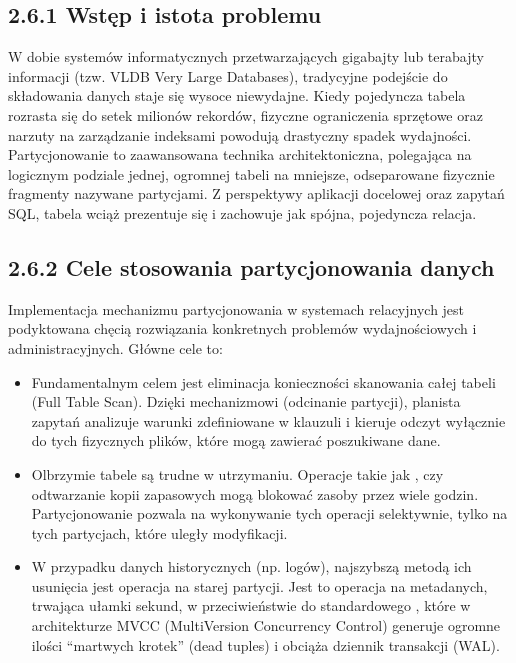\documentclass[a4paper,11pt,english,openany,oneside]{sphinxmanual}
\begin{document}
\subsection{2.6.1 Wstęp i istota problemu}
\label{\detokenize{rozdzial_2/rozdzial_26/index:wstep-i-istota-problemu}}
\sphinxAtStartPar
W dobie systemów informatycznych przetwarzających gigabajty lub terabajty informacji (tzw. VLDB \sphinxhyphen{} Very Large Databases), tradycyjne podejście do składowania danych staje się wysoce niewydajne. Kiedy pojedyncza tabela rozrasta się do setek milionów rekordów, fizyczne ograniczenia sprzętowe oraz narzuty na zarządzanie indeksami powodują drastyczny spadek wydajności. Partycjonowanie to zaawansowana technika architektoniczna, polegająca na logicznym podziale jednej, ogromnej tabeli na mniejsze, odseparowane fizycznie fragmenty nazywane partycjami. Z perspektywy aplikacji docelowej oraz zapytań SQL, tabela wciąż prezentuje się i zachowuje jak spójna, pojedyncza relacja.


\subsection{2.6.2 Cele stosowania partycjonowania danych}
\label{\detokenize{rozdzial_2/rozdzial_26/index:cele-stosowania-partycjonowania-danych}}
\sphinxAtStartPar
Implementacja mechanizmu partycjonowania w systemach relacyjnych jest podyktowana chęcią rozwiązania konkretnych problemów wydajnościowych i administracyjnych. Główne cele to:
\begin{itemize}
\item {} 
\sphinxAtStartPar
{} Fundamentalnym celem jest eliminacja konieczności skanowania całej tabeli (Full Table Scan). Dzięki mechanizmowi  (odcinanie partycji), planista zapytań analizuje warunki zdefiniowane w klauzuli  i kieruje odczyt wyłącznie do tych fizycznych plików, które mogą zawierać poszukiwane dane.

\item {} 
\sphinxAtStartPar
{} Olbrzymie tabele są trudne w utrzymaniu. Operacje takie jak ,  czy odtwarzanie kopii zapasowych mogą blokować zasoby przez wiele godzin. Partycjonowanie pozwala na wykonywanie tych operacji selektywnie, tylko na tych partycjach, które uległy modyfikacji.

\item {} 
\sphinxAtStartPar
{} W przypadku danych historycznych (np. logów), najszybszą metodą ich usunięcia jest operacja  na starej partycji. Jest to operacja na metadanych, trwająca ułamki sekund, w przeciwieństwie do standardowego , które w architekturze MVCC (Multi\sphinxhyphen{}Version Concurrency Control) generuje ogromne ilości “martwych krotek” (dead tuples) i obciąża dziennik transakcji (WAL).

\end{itemize}
\end{document}

